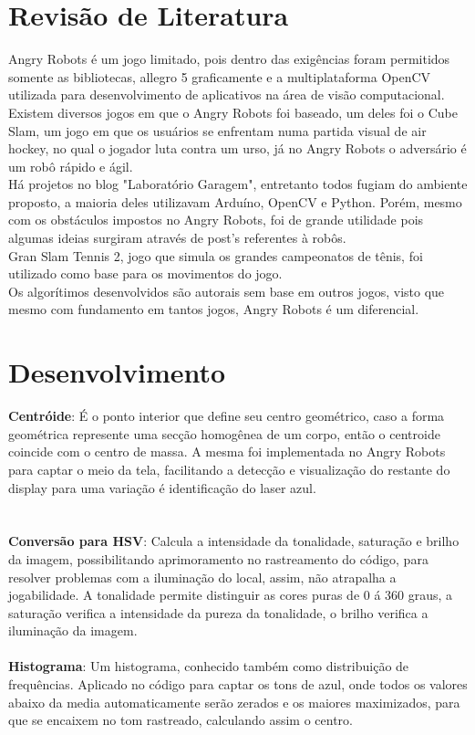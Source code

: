 \documentclass[12pt,openright,oneside,a4paper,brazil]{abntex2}
\begin{document}
\section*{Revisão de Literatura}

Angry Robots é um jogo limitado, pois dentro das exigências foram permitidos somente as bibliotecas, allegro 5 graficamente e a multiplataforma OpenCV utilizada para desenvolvimento de aplicativos na área de visão computacional. \\
Existem diversos jogos em que o Angry Robots foi baseado, um deles foi o Cube Slam, um jogo em que os usuários se enfrentam numa partida visual de air hockey, no qual o jogador luta contra um urso, já no Angry Robots o adversário é um robô rápido e ágil. \\
Há projetos no blog "Laboratório Garagem", entretanto todos fugiam do ambiente proposto, a maioria deles utilizavam Arduíno, OpenCV e Python. Porém, mesmo com os obstáculos impostos no Angry Robots, foi de grande utilidade pois algumas ideias surgiram através de post's referentes à robôs. \\
Gran Slam Tennis 2, jogo que simula os grandes campeonatos de tênis, foi utilizado como base para os movimentos do jogo. \\ 
Os algorítimos desenvolvidos são autorais sem base em outros jogos, visto que mesmo com fundamento em tantos jogos, Angry Robots é um diferencial.

\section*{Desenvolvimento}
\textbf{Centróide}:
É o ponto interior que define seu centro geométrico, caso a forma geométrica represente uma secção homogênea de um corpo, então o centroide coincide com o centro de massa. A mesma foi implementada no Angry Robots para captar o meio da tela, facilitando a detecção e visualização do restante do display para uma variação é identificação do laser azul. 
\\ \\ \\ \textbf{Conversão para HSV}: 
Calcula a intensidade da tonalidade, saturação e brilho da imagem, possibilitando aprimoramento no rastreamento do código, para resolver problemas com a iluminação do local, assim, não atrapalha a jogabilidade. A tonalidade permite distinguir as cores puras de 0 á 360 graus, a saturação verifica a intensidade da pureza da tonalidade, o brilho verifica a iluminação da imagem. 
\\ \\ \textbf{Histograma}:
Um histograma, conhecido também como distribuição de frequências. Aplicado no código para captar os tons de azul, onde todos os valores abaixo da media automaticamente serão zerados e os maiores maximizados, para que se encaixem no tom rastreado, calculando assim o centro.
\end{document}
